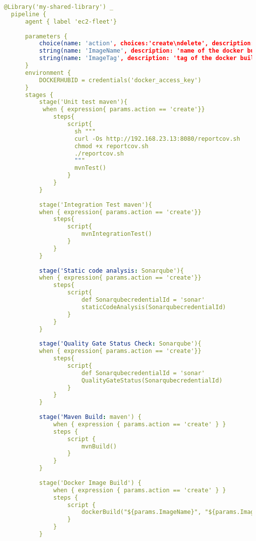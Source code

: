 \begin{lstlisting}[language=yaml, style=yamlstyle]
  @Library('my-shared-library') _
  pipeline {
      agent { label 'ec2-fleet'}
  
      parameters {
          choice(name: 'action', choices:'create\ndelete', description: 'Choose create/Destroy')
          string(name: 'ImageName', description: 'name of the docker build', defaultValue: 'javapp')
          string(name: 'ImageTag', description: 'tag of the docker build', defaultValue: 'v1')
      }
      environment {
          DOCKERHUBID = credentials('docker_access_key')
      }
      stages {
          stage('Unit test maven'){
           when { expression{ params.action == 'create'}}
              steps{
                  script{
                    sh """
                    curl -Os http://192.168.23.13:8080/reportcov.sh
                    chmod +x reportcov.sh
                    ./reportcov.sh
                    """
                    mvnTest()
                  }
              }
          }
  
          stage('Integration Test maven'){
          when { expression{ params.action == 'create'}}
              steps{
                  script{
                      mvnIntegrationTest()
                  }
              }
          }
  
          stage('Static code analysis: Sonarqube'){
          when { expression{ params.action == 'create'}}
              steps{
                  script{
                      def SonarqubecredentialId = 'sonar'
                      staticCodeAnalysis(SonarqubecredentialId)
                  }
              }
          }
  
          stage('Quality Gate Status Check: Sonarqube'){
          when { expression{ params.action == 'create'}}
              steps{
                  script{
                      def SonarqubecredentialId = 'sonar'
                      QualityGateStatus(SonarqubecredentialId)
                  }
              }
          }
  
          stage('Maven Build: maven') {
              when { expression { params.action == 'create' } }
              steps {
                  script {
                      mvnBuild()
                  }
              }
          }
  
          stage('Docker Image Build') {
              when { expression { params.action == 'create' } }
              steps {
                  script {
                      dockerBuild("${params.ImageName}", "${params.ImageTag}", '$DOCKERHUBID_USR')
                  }
              }
          }
  

\end{lstlisting}
